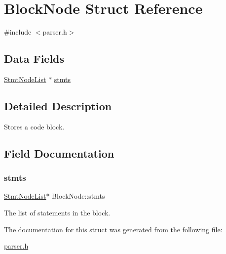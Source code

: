 \hypertarget{struct_block_node}{}\section{Block\+Node Struct Reference}
\label{struct_block_node}


{\ttfamily \#include $<$parser.\+h$>$}

\subsection*{Data Fields}
\begin{DoxyCompactItemize}
\item 
\hyperlink{struct_stmt_node_list}{Stmt\+Node\+List} $\ast$ \hyperlink{struct_block_node_a5d918092ee6d41f6be62dff435aede89}{stmts}
\end{DoxyCompactItemize}


\subsection{Detailed Description}
Stores a code block. 

\subsection{Field Documentation}
\mbox{\label{struct_block_node_a5d918092ee6d41f6be62dff435aede89}} 
\subsubsection{\texorpdfstring{stmts}{stmts}}
{\footnotesize\ttfamily \hyperlink{struct_stmt_node_list}{Stmt\+Node\+List}$\ast$ Block\+Node\+::stmts}

The list of statements in the block. 

The documentation for this struct was generated from the following file\+:\begin{DoxyCompactItemize}
\item 
\hyperlink{parser_8h}{parser.\+h}\end{DoxyCompactItemize}
